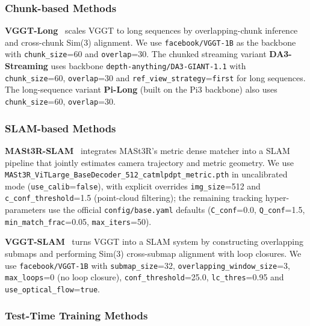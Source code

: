 \documentclass{llmxive}
\begin{document}
\subsubsection{Chunk-based Methods}

\textbf{VGGT-Long}~\citep{deng2025vggtlong} scales VGGT to long sequences by overlapping-chunk inference and cross-chunk Sim(3) alignment.
%
We use \texttt{facebook/VGGT-1B} as the backbone with \texttt{chunk\_size}=60 and \texttt{overlap}=30.
%
The chunked streaming variant \textbf{DA3-Streaming} uses backbone \texttt{depth-anything/DA3-GIANT-1.1} with \texttt{chunk\_size}=60, \texttt{overlap}=30 and \texttt{ref\_view\_strategy}=\texttt{first} for long sequences.
%
The long-sequence variant \textbf{Pi-Long} (built on the Pi3 backbone) also uses \texttt{chunk\_size}=60, \texttt{overlap}=30.

\subsubsection{SLAM-based Methods}

\textbf{MASt3R-SLAM}~\citep{murai2024_mast3rslam} integrates MASt3R's metric dense
matcher into a SLAM pipeline that jointly estimates camera trajectory and
metric geometry.
%
We use \texttt{MASt3R\_ViTLarge\_BaseDecoder\_512\_catmlpdpt\_metric.pth} in uncalibrated mode (\texttt{use\_calib}=\texttt{false}), with explicit overrides \texttt{img\_size}=512 and \texttt{c\_conf\_threshold}=1.5 (point-cloud filtering); the remaining tracking hyper-parameters use the official \texttt{config/base.yaml} defaults (\texttt{C\_conf}=0.0, \texttt{Q\_conf}=1.5, \texttt{min\_match\_frac}=0.05, \texttt{max\_iters}=50).


\textbf{VGGT-SLAM}~\citep{maggio2025vggt-slam2} turns VGGT into a SLAM system
by constructing overlapping submaps and performing Sim(3) cross-submap
alignment with loop closures.
%
We use \texttt{facebook/VGGT-1B} with \texttt{submap\_size}=32, \texttt{overlapping\_window\_size}=3, \texttt{max\_loops}=0 (no loop closure), \texttt{conf\_threshold}=25.0, \texttt{lc\_thres}=0.95 and \texttt{use\_optical\_flow}=\texttt{true}.

\subsubsection{Test-Time Training Methods}
\end{document}
